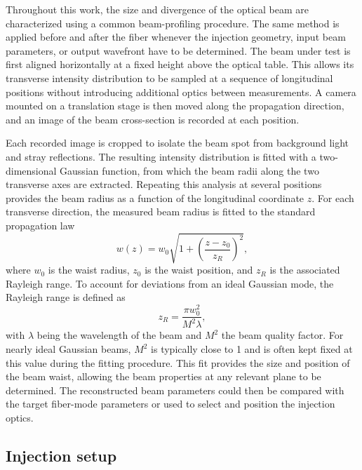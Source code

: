Throughout this work, the size and divergence of the optical beam are
characterized using a common beam-profiling procedure. The same method is
applied before and after the fiber whenever the injection geometry, input
beam parameters, or output wavefront have to be determined.
The beam under test is first aligned horizontally at a fixed height above
the optical table. This allows its transverse intensity distribution to be
sampled at a sequence of longitudinal positions without introducing
additional  optics between measurements. A camera mounted on a
translation stage is then moved along the propagation direction, and an
image of the beam cross-section is recorded at each position.

Each recorded image is cropped to isolate the beam spot from background
light and stray reflections. The resulting intensity distribution is fitted
with a two-dimensional Gaussian function, from which the beam radii along the
two transverse axes are extracted. Repeating this analysis at several
positions provides the beam radius as a function of the longitudinal
coordinate $z$.
For each transverse direction, the measured beam radius is fitted to the standard propagation law
\begin{equation}
    \label{eq:gaussian_beam}
    w(z) =
    w_0
    \sqrt{
        1+
        \left(
            \frac{z-z_0}{z_R}
        \right)^2
    },
\end{equation}
where $w_0$ is the waist radius, $z_0$ is the waist position, and $z_R$ is the associated Rayleigh range. To account for deviations from an ideal Gaussian mode, the Rayleigh range is defined as
\begin{equation}
    z_R = \frac{\pi w_0^2}{M^2 \lambda},
\end{equation}
with $\lambda$ being the wavelength of the beam and $M^2$ the beam quality factor. For nearly ideal Gaussian beams, $M^2$ is typically close to 1 and is often kept fixed at this value during the fitting procedure. This fit provides the size and position of the beam waist, allowing the beam properties at any relevant plane to be determined. The reconstructed beam parameters could then be compared with the target fiber-mode parameters or used to select and position the injection optics.

\subsection{Injection setup}
\label{subsec:black_fiber_setup}

